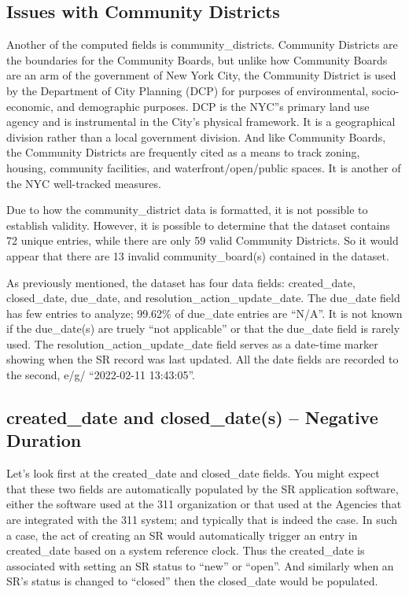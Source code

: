 \documentclass[12pt, titlepage]{article}
\begin{document}
{	\subsection{Issues with Community Districts}
	Another of the computed fields is community\_districts. Community Districts 
	are the boundaries for the Community Boards, but unlike how 
	Community Boards are an arm of the government of New York City, 
	the Community District is used by the Department of City Planning 
	(DCP) for purposes of environmental, socio-economic, and demographic 
	purposes. DCP is the NYC''s primary land use agency and is 
	instrumental in the City's physical framework.  It is a geographical 
	division rather than a local government division. And like Community 
	Boards, the Community Districts are frequently cited as a means to 
	track zoning, housing, community facilities, and waterfront/open/public spaces. 
	It is another of the NYC well-tracked measures.

	Due to how the community\_district data is formatted, it is not possible 
	to establish validity. However, it is possible to determine that the 
	dataset contains 72 unique entries, while there are only 59 valid Community 
	Districts. So it would appear that there are 13 invalid 
	community\_board(s) contained in the dataset.
	
As previously mentioned, the dataset has four data fields:  created\_date, 
closed\_date, due\_date, and resolution\_action\_update\_date. 
The due\_date field has few entries to analyze; 99.62\% of due\_date entries 
are ``N/A''.  It is not known if the due\_date(s) are truely ``not applicable'' 
or that the due\_date field is rarely used. The  resolution\_action\_update\_date 
field serves as a date-time marker showing when the SR record was last updated.  
All the date fields are recorded to the second, e/g/ ``2022-02-11 13:43:05''.

\subsection{created\_date and closed\_date(s) -- Negative Duration}
Let's look first at the created\_date and closed\_date fields. You might 
expect that these two fields are automatically populated by the 
SR application software, either the software used at the 311 organization 
or that used at the Agencies that are integrated with the 311 system; 
and typically that is indeed the case. In such a case, the act of creating an 
SR would automatically trigger an entry in created\_date based on a 
system reference clock. Thus the created\_date is associated with 
setting an SR status to ``new'' or ``open''. And similarly when an SR's 
status is changed to ``closed'' then the closed\_date would be populated. 

}
\end{document}
